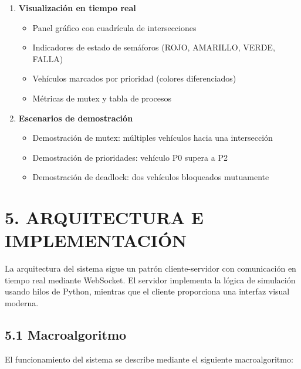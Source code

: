 \documentclass[12pt,a4paper]{article}
\begin{document}
\begin{enumerate}
    \item \textbf{Visualización en tiempo real}
    \begin{itemize}
        \item Panel gráfico con cuadrícula de intersecciones
        \item Indicadores de estado de semáforos (ROJO, AMARILLO, VERDE, FALLA)
        \item Vehículos marcados por prioridad (colores diferenciados)
        \item Métricas de mutex y tabla de procesos
    \end{itemize}
    
    \item \textbf{Escenarios de demostración}
    \begin{itemize}
        \item Demostración de mutex: múltiples vehículos hacia una intersección
        \item Demostración de prioridades: vehículo P0 supera a P2
        \item Demostración de deadlock: dos vehículos bloqueados mutuamente
    \end{itemize}
\end{enumerate}

\newpage

\section{5. ARQUITECTURA E IMPLEMENTACIÓN}

La arquitectura del sistema sigue un patrón cliente-servidor con comunicación en tiempo real mediante WebSocket. El servidor implementa la lógica de simulación usando hilos de Python, mientras que el cliente proporciona una interfaz visual moderna.

\subsection{5.1 Macroalgoritmo}

El funcionamiento del sistema se describe mediante el siguiente macroalgoritmo:
\end{document}
